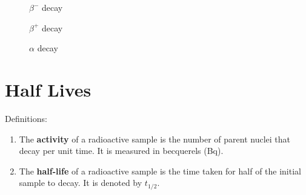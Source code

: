 \documentclass[a4paper,12pt]{article}
\let\oldsection\section
\renewcommand\section{\clearpage\oldsection}
\begin{document}
\begin{enumerate}
        \begin{minipage}{0.3\textwidth}
          \begin{figure}[H]
            \centering
            \caption{$\beta^-$ decay}
          \end{figure}
        \end{minipage}%
        \begin{minipage}{0.3\textwidth}
          \begin{figure}[H]
            \centering
            \caption{$\beta^+$ decay}
          \end{figure}
        \end{minipage}%
        \begin{minipage}{0.3\textwidth}
          \begin{figure}[H]
            \centering
            \caption{$\alpha$ decay}
          \end{figure}
        \end{minipage}
\end{enumerate}

\section{Half Lives}

Definitions:
\begin{enumerate}
  \item The \textbf{activity} of a radioactive sample is the number of parent nuclei that decay per unit time. It is measured in becquerels (Bq).
  \item The \textbf{half-life} of a radioactive sample is the time taken for half of the initial sample to decay. It is denoted by $t_{1/2}$.
\end{enumerate}
\end{document}
